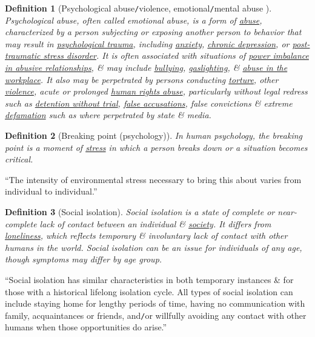 \documentclass[12pt,twoside]{book}
\newtheorem{definition}{Definition}[section]
\begin{document}
\begin{definition}[Psychological abuse{\tt/}violence, emotional{\tt/}mental abuse ]
	\emph{Psychological abuse}, often called \emph{emotional abuse}, is a form of \href{https://en.wikipedia.org/wiki/Abuse}{abuse}, characterized by a person subjecting or exposing another person to behavior that may result in \href{https://en.wikipedia.org/wiki/Psychological_trauma}{psychological trauma}, including \href{https://en.wikipedia.org/wiki/Anxiety_disorder}{anxiety}, \href{https://en.wikipedia.org/wiki/Chronic_depression}{chronic depression}, or \href{https://en.wikipedia.org/wiki/Post-traumatic_stress_disorder}{post-traumatic stress disorder}. It is often associated with situations of \href{https://en.wikipedia.org/wiki/Abusive_power_and_control}{power imbalance in abusive relationships}, \& may include \href{https://en.wikipedia.org/wiki/Bullying}{bullying}, \href{https://en.wikipedia.org/wiki/Gaslighting}{gaslighting}, \& \href{https://en.wikipedia.org/wiki/Workplace_bullying}{abuse in the workplace}. It also may be perpetrated by persons conducting \href{https://en.wikipedia.org/wiki/Torture}{torture}, other \href{https://en.wikipedia.org/wiki/Violence}{violence}, acute or prolonged \href{https://en.wikipedia.org/wiki/Human_rights_abuse}{human rights abuse}, particularly without legal redress such as \href{https://en.wikipedia.org/wiki/Detention_without_trial}{detention without trial}, \href{https://en.wikipedia.org/wiki/False_accusation}{false accusations}, false convictions \& extreme \href{https://en.wikipedia.org/wiki/Defamation}{defamation} such as where perpetrated by state \& media. 
\end{definition}

\begin{definition}[Breaking point (psychology)]
	In human psychology, the \emph{breaking point} is a moment of \href{https://en.wikipedia.org/wiki/Stress_(medicine)}{stress} in which a person breaks down or a situation becomes critical.
\end{definition}
``The intensity of environmental stress necessary to bring this about varies from individual to individual.''

\begin{definition}[Social isolation]
	\emph{Social isolation} is a state of complete or near-complete lack of contact between an individual \& \href{https://en.wikipedia.org/wiki/Society}{society}. It differs from \href{https://en.wikipedia.org/wiki/Loneliness}{loneliness}, which reflects temporary \& involuntary lack of contact with other humans in the world. Social isolation can be an issue for individuals of any age, though symptoms may differ by age group.
\end{definition}
``Social isolation has similar characteristics in both temporary instances \& for those with a historical lifelong isolation cycle. All types of social isolation can include staying home for lengthy periods of time, having no communication with family, acquaintances or friends, and{\tt/}or willfully avoiding any contact with other humans when those opportunities do arise.''
\end{document}
